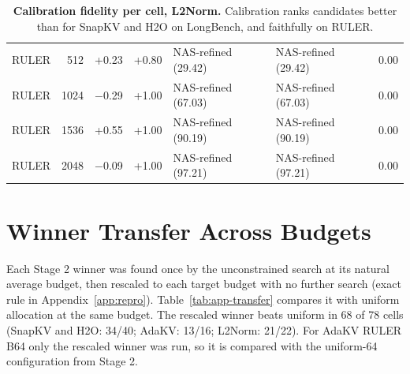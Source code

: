 \begin{table}[t]
\begin{tabular}{@{}l r r r l l r@{}}
    RULER & 512 & +0.23 & +0.80 & NAS-refined (29.42) & NAS-refined (29.42) & 0.00 \\
    RULER & 1024 & $-$0.29 & +1.00 & NAS-refined (67.03) & NAS-refined (67.03) & 0.00 \\
    RULER & 1536 & +0.55 & +1.00 & NAS-refined (90.19) & NAS-refined (90.19) & 0.00 \\
    RULER & 2048 & $-$0.09 & +1.00 & NAS-refined (97.21) & NAS-refined (97.21) & 0.00 \\
    \bottomrule
  \end{tabular}
  \caption{\textbf{Calibration fidelity per cell, L2Norm.} Calibration ranks candidates better than for SnapKV and H2O on LongBench, and faithfully on RULER.}
  \label{tab:app-calib-l2norm}
\end{table}


\section{Winner Transfer Across Budgets}
\label{app:transfer}

Each Stage 2 winner was found once by the unconstrained search at its natural average budget, then rescaled to each target budget with no further search (exact rule in Appendix~\ref{app:repro}). Table~\ref{tab:app-transfer} compares it with uniform allocation at the same budget. The rescaled winner beats uniform in 68 of 78 cells (SnapKV and H2O: 34/40; AdaKV: 13/16; L2Norm: 21/22). For AdaKV RULER B64 only the rescaled winner was run, so it is compared with the uniform-64 configuration from Stage 2.

